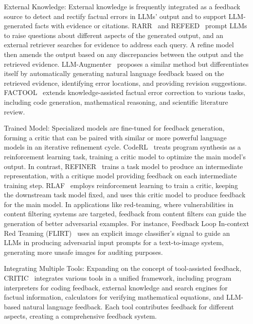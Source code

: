 \documentclass[12pt]{extarticle}
\begin{document}
External Knowledge: External knowledge is frequently integrated as a feedback source to detect and rectify factual errors in LLMs' output and to support LLM-generated facts with evidence or citations. RARR~\cite{gao2023rarr} and REFEED~\cite{yu2023improving} prompt LLMs to raise questions about different aspects of the generated output, and an external retriever searches for evidence to address each query. A refine model then amends the output based on any discrepancies between the output and the retrieved evidence. LLM-Augmenter~\cite{peng2023check} proposes a similar method but differentiates itself by automatically generating natural language feedback based on the retrieved evidence, identifying error locations, and providing revision suggestions. FACTOOL~\cite{chern2023factool} extends knowledge-assisted factual error correction to various tasks, including code generation, mathematical reasoning, and scientific literature review.

Trained Model: Specialized models are fine-tuned for feedback generation, forming a critic that can be paired with similar or more powerful language models in an iterative refinement cycle. CodeRL~\cite{le2022coderl} treats program synthesis as a reinforcement learning task, training a critic model to optimize the main model's output. In contrast, REFINER~\cite{paul2023refiner} trains a task model to produce an intermediate representation, with a critique model providing feedback on each intermediate training step. RLAF~\cite{akyurek-etal-2023-rl4f} employs reinforcement learning to train a critic, keeping the downstream task model fixed, and uses this critic model to produce feedback for the main model. In applications like red-teaming, where vulnerabilities in content filtering systems are targeted, feedback from content filters can guide the generation of better adversarial examples. For instance, Feedback Loop In-context Red Teaming (FLIRT)~\cite{mehrabi2023flirt} uses an explicit image classifier's signal to guide an LLMs in producing adversarial input prompts for a text-to-image system, generating more unsafe images for auditing purposes.

Integrating Multiple Tools: Expanding on the concept of tool-assisted feedback, CRITIC~\cite{gou2023critic} integrates various tools in a unified framework, including program interpreters for coding feedback, external knowledge and search engines for factual information, calculators for verifying mathematical equations, and LLM-based natural language feedback. Each tool contributes feedback for different aspects, creating a comprehensive feedback system.
\end{document}
